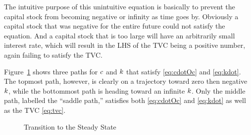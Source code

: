 \documentclass{handout}
\begin{document}
The intuitive purpose of this unintuitive equation is basically to prevent
the capital stock from becoming negative or infinity as time goes by.  
Obviously a capital stock that was negative for the entire future could not 
satisfy the equation.  And a capital stock that is too large will have 
an arbitrarily small interest rate, which will result in the LHS of the 
TVC being a positive number, again failing to satisfy the TVC.

Figure~\ref{fig:RamseySaddlePlot} shows three paths for $c$ and ${k}$
that satisfy \eqref{eq:cdotOc} and \eqref{eq:kdot}.  The topmost path,
however, is clearly on a trajectory toward zero then negative
${k}$, while the bottommost path is heading toward an infinite
${k}$.  Only the middle path, labelled the ``saddle path,'' satisfies
both \eqref{eq:cdotOc} and \eqref{eq:kdot} as well as the TVC
\eqref{eq:tvc}.

\begin{figure}
\caption{Transition to the Steady State}\label{fig:RamseySaddlePlot}
\end{figure}




\ifdvi
{}
\fi
\end{document}
